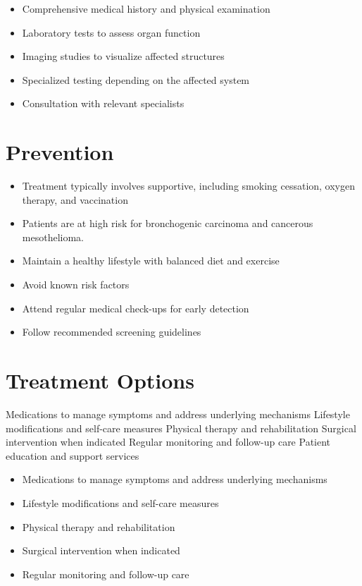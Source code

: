 \begin{itemize}[noitemsep]
  \item Comprehensive medical history and physical examination
  \item Laboratory tests to assess organ function
  \item Imaging studies to visualize affected structures
  \item Specialized testing depending on the affected system
  \item Consultation with relevant specialists
\end{itemize}
\section{Prevention}
\begin{itemize}[noitemsep]
  \item Treatment typically involves supportive, including smoking cessation, oxygen therapy, and vaccination
  \item Patients are at high risk for bronchogenic carcinoma and cancerous mesothelioma.
  \item Maintain a healthy lifestyle with balanced diet and exercise
  \item Avoid known risk factors
  \item Attend regular medical check-ups for early detection
  \item Follow recommended screening guidelines
\end{itemize}
\section{Treatment Options}
Medications to manage symptoms and address underlying mechanisms Lifestyle modifications and self-care measures Physical therapy and rehabilitation Surgical intervention when indicated Regular monitoring and follow-up care Patient education and support services

\begin{itemize}[noitemsep]
  \item Medications to manage symptoms and address underlying mechanisms
  \item Lifestyle modifications and self-care measures
  \item Physical therapy and rehabilitation
  \item Surgical intervention when indicated
  \item Regular monitoring and follow-up care
\end{itemize}
